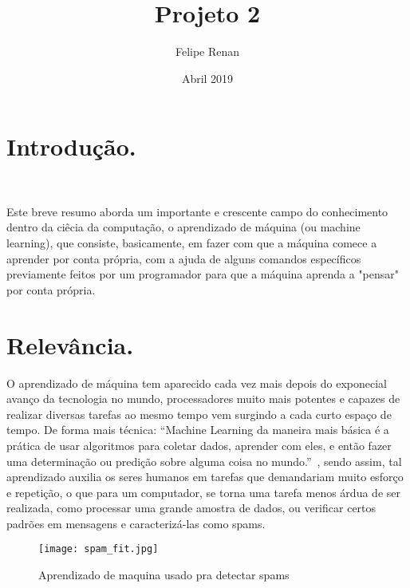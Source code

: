 \documentclass[10pt]{article}
\title{Projeto 2}
\author{Felipe Renan }
\date{Abril 2019}
\begin{document}
\section{Introdução.}\

\begin{flushleft}
\setlength{\baselineskip}{1.5\baselineskip}

Este breve resumo aborda um importante e crescente campo do conhecimento dentro da ciêcia da computação, o aprendizado de máquina (ou machine learning), que consiste, basicamente, em fazer com que a máquina comece a aprender por conta própria, com a ajuda de alguns comandos específicos previamente feitos por um programador para que a máquina aprenda a "pensar" por conta própria.
\end{flushleft}
\section{Relevância.}


\begin{flushleft}
\setlength{\baselineskip}{1.3\baselineskip}
O aprendizado de máquina tem aparecido cada vez mais depois do exponecial avanço da tecnologia no mundo, processadores muito mais potentes e capazes de realizar diversas tarefas ao mesmo tempo vem surgindo a cada curto espaço de tempo. De forma mais técnica: ``Machine Learning da maneira mais básica é a prática de usar algoritmos para coletar dados, aprender com eles, e então fazer uma determinação ou predição sobre alguma coisa no mundo.''~\cite{ref1}, sendo assim,  tal aprendizado auxilia os seres humanos em tarefas que demandariam muito esforço e repetição, o que para um computador, se torna uma tarefa menos árdua de ser realizada, como processar uma grande amostra de dados, ou verificar certos padrões em mensagens e caracterizá-las como spams. 
\end{flushleft}
\begin{figure}[h]
    \centering
    \texttt{[image: spam\_fit.jpg]}
    \caption{Aprendizado de maquina usado pra detectar spams}
    \label{fig:my_label}
\end{figure}
\end{document}
